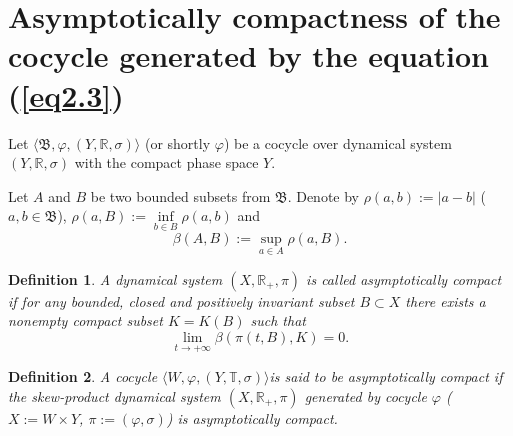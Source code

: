 \documentclass{amsart}%
\newtheorem{lemma}{Lemma}[section]
\newtheorem{definition}[lemma]{Definition}
\begin{document}
\section{Asymptotically compactness of the cocycle generated by
the equation (\ref{eq2.3})}\label{Sec4}


Let $\langle \mathfrak B,\varphi, (Y,\mathbb R,\sigma)\rangle$ (or
shortly $\varphi$) be a cocycle over dynamical system $(Y,\mathbb
R,\sigma)$ with the compact phase space $Y$.

Let $A$ and $B$ be two bounded subsets from $\mathfrak B$. Denote
by $\rho(a,b):=|a-b|$ ($a,b\in \mathfrak B$),
$\rho(a,B):=\inf\limits_{b\in B}\rho(a,b)$ and
\begin{equation}\label{eqAC1_1}
\beta(A,B):=\sup\limits_{a\in A}\rho(a,B).\nonumber
\end{equation}

\begin{definition}\label{defAC1} A dynamical system $(X,\mathbb
R_{+},\pi)$ is called asymptotically compact \cite[Ch.I]{Che_2015}
if for any bounded, closed and positively invariant subset
$B\subset X$ there exists a nonempty compact subset $K=K(B)$ such
that
\begin{equation}\label{eqAC1_2}
\lim\limits_{t\to +\infty}\beta(\pi(t,B),K)=0.\nonumber
\end{equation}
\end{definition}

\begin{definition}\label{defAC2} A cocycle $\langle W,\varphi,(Y,\mathbb
T,\sigma)\rangle$is said to be asymptotically compact if the
skew-product dynamical system $(X,\mathbb R_{+},\pi)$ generated by
cocycle $\varphi$ ($X:=W\times Y$, $\pi :=(\varphi,\sigma)$) is
asymptotically compact.
\end{definition}



\end{document}
